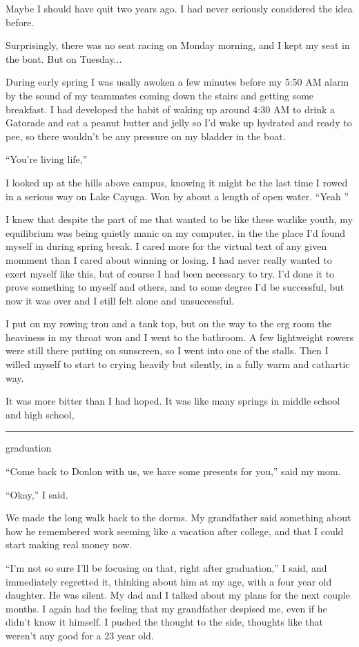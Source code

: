 Maybe I should have quit two years ago.  I had never seriously considered the
idea before.

Surprisingly, there was no seat racing on Monday morning, and I kept my seat in
the boat.  But on Tuesday...

During early spring I was usally awoken a few minutes before my 5:50 AM alarm by
the sound of my teammates coming down the stairs and getting some breakfast.  I
had developed the habit of waking up around 4:30 AM to drink a Gatorade and eat
a peanut butter and jelly so I'd wake up hydrated and ready to pee, so there
wouldn't be any pressure on my bladder in the boat. 

``You're living life,''

I looked up at the hills above campus, knowing it might be the last time I rowed
in a serious way on Lake Cayuga.  Won by about a length of open water.  ``Yeah
'' 

I knew that despite the part of me that wanted to be like these warlike youth,
my equilibrium was being quietly manic on my computer, in the the place I'd
found myself in during spring break.  I cared more for the virtual text of any
given momment than I cared about winning or losing.  I had never really wanted
to exert myself like this, but of course I had been necessary to try.  I'd done
it to prove something to myself and others, and to some degree I'd be
successful, but now it was over and I still felt alone and unsuccessful.

I put on my rowing trou and a tank top, but on the way to the erg room the
heaviness in my throat won and I went to the bathroom.  A few lightweight
rowers were still there putting on sunscreen, so I went into one of the stalls.
Then I willed myself to start to crying heavily but silently, in a fully warm
and cathartic way.  

It was more bitter than I had hoped.  It was like many springs in middle school
and high school, 

\plainfancybreak{12pt}{2}{* * *}

graduation

``Come back to Donlon with us, we have some presents for you,'' said my mom. 

``Okay,'' I said.  

We made the long walk back to the dorms.  My grandfather said something about
how he remembered work seeming like a vacation after college, and that I could
start making real money now.

``I'm not so sure I'll be focusing on that, right after graduation,'' I said,
and immediately regretted it, thinking about him at my age, with a four year old
daughter.  He was silent.  My dad and I talked about my plans for the next
couple months.  I again had the feeling that my grandfather despised me, even if
he didn't know it himself.  I pushed the thought to the side, thoughts like that
weren't any good for a 23 year old.

